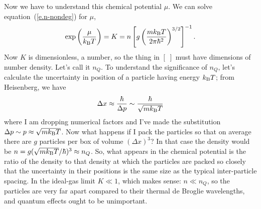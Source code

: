 Now we have to understand this chemical potential $\mu$.  We can solve equation~(\ref{e.n-nondeg}) for $\mu$,
\begin{equation}\label{e.fugacity-nondeg}
\exp\left(\frac{\mu}{k_\mathrm{B} T}\right) = K = n\left[g\left(\frac{mk_\mathrm{B} T}{2\pi\hbar^{2}}\right)^{3/2}\right]^{-1}.
\end{equation}
Now $K$ is dimensionless, a number, so the thing in $[\;]$ must have dimensions of number density.  Let's call it $n_{Q}$.  To understand the significance of $n_{Q}$, let's calculate the uncertainty in position of a particle having energy $k_\mathrm{B} T$; from Heisenberg, we have
\[
\Delta x \approx \frac{\hbar}{\Delta p} \sim \frac{\hbar}{\sqrt{mk_\mathrm{B} T}}
\]
where I am dropping numerical factors and I've made the substitution $\Delta p\sim p \approx \sqrt{mk_\mathrm{B} T}$.  Now what happens if I pack the particles so that on average there are $g$ particles per box of volume $(\Delta x)^{3}$?  In that case the density would be $n = g(\sqrt{mk_\mathrm{B} T}/\hbar)^{3} \approx n_{Q}$.  So, what appears in the chemical potential is the ratio of the density to that density at which the particles are packed so closely that the uncertainty in their positions is the same size as the typical inter-particle spacing.
In the ideal-gas limit $K \ll 1$, which makes sense: $n\ll n_{Q}$, so the particles are very far apart compared to their thermal de Broglie wavelengths, and quantum effects ought to be unimportant.

